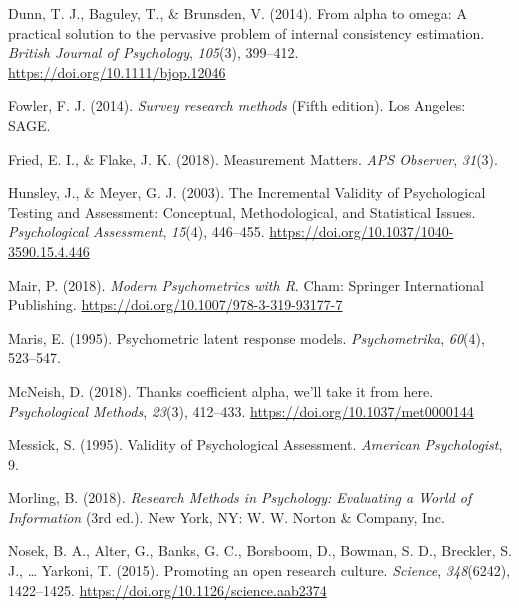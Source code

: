 \documentclass[
  english,
  man]{apa6}
\begin{document}
\leavevmode\hypertarget{ref-dunnAlphaOmegaPractical2014}{}%
Dunn, T. J., Baguley, T., \& Brunsden, V. (2014). From alpha to omega: A practical solution to the pervasive problem of internal consistency estimation. \emph{British Journal of Psychology}, \emph{105}(3), 399--412. \url{https://doi.org/10.1111/bjop.12046}

\leavevmode\hypertarget{ref-fowlerSurveyResearchMethods2014}{}%
Fowler, F. J. (2014). \emph{Survey research methods} (Fifth edition). Los Angeles: SAGE.

\leavevmode\hypertarget{ref-friedMeasurementMatters2018}{}%
Fried, E. I., \& Flake, J. K. (2018). Measurement Matters. \emph{APS Observer}, \emph{31}(3).

\leavevmode\hypertarget{ref-hunsleyIncrementalValidityPsychological2003}{}%
Hunsley, J., \& Meyer, G. J. (2003). The Incremental Validity of Psychological Testing and Assessment: Conceptual, Methodological, and Statistical Issues. \emph{Psychological Assessment}, \emph{15}(4), 446--455. \url{https://doi.org/10.1037/1040-3590.15.4.446}

\leavevmode\hypertarget{ref-mairModernPsychometrics2018}{}%
Mair, P. (2018). \emph{Modern Psychometrics with R}. Cham: Springer International Publishing. \url{https://doi.org/10.1007/978-3-319-93177-7}

\leavevmode\hypertarget{ref-marisPsychometricLatentResponse1995}{}%
Maris, E. (1995). Psychometric latent response models. \emph{Psychometrika}, \emph{60}(4), 523--547.

\leavevmode\hypertarget{ref-mcneishThanksCoefficientAlpha2018}{}%
McNeish, D. (2018). Thanks coefficient alpha, we'll take it from here. \emph{Psychological Methods}, \emph{23}(3), 412--433. \url{https://doi.org/10.1037/met0000144}

\leavevmode\hypertarget{ref-messickValidityPsychologicalAssessment1995}{}%
Messick, S. (1995). Validity of Psychological Assessment. \emph{American Psychologist}, 9.

\leavevmode\hypertarget{ref-morlingResearchMethodsPsychology2018}{}%
Morling, B. (2018). \emph{Research Methods in Psychology: Evaluating a World of Information} (3rd ed.). New York, NY: W. W. Norton \& Company, Inc.

\leavevmode\hypertarget{ref-Nosek2015}{}%
Nosek, B. A., Alter, G., Banks, G. C., Borsboom, D., Bowman, S. D., Breckler, S. J., \ldots{} Yarkoni, T. (2015). Promoting an open research culture. \emph{Science}, \emph{348}(6242), 1422--1425. \url{https://doi.org/10.1126/science.aab2374}
\end{document}
